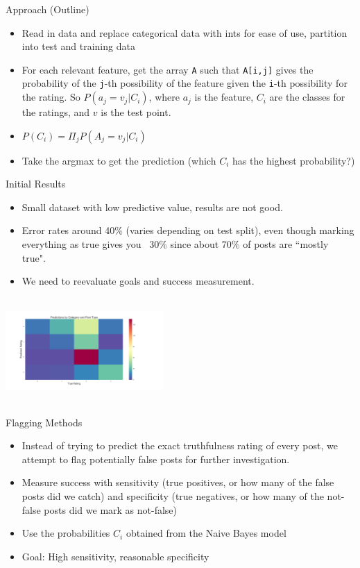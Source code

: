 \documentclass[xcolor=dvipsnames, 14pt]{beamer}
\begin{document}
\begin{frame}{Approach (Outline)}
\small
\begin{itemize}
\item Read in data and replace categorical data with ints for ease of use, partition into test and training data
\item For each relevant feature, get the array \texttt{A} such that \texttt{A[i,j]} gives the probability of the \texttt{j}-th possibility of the feature given the \texttt{i}-th possibility for the rating. So $P(a_j = v_j | C_i)$, where $a_j$ is the feature, $C_i$ are the classes for the ratings, and $v$ is the test point.
\item $P(C_i) = \Pi_j P(A_j = v_j|C_i)$
\item Take the argmax to get the prediction (which $C_i$ has the highest probability?)
\end{itemize}
\end{frame}

\begin{frame}{Initial Results}
\begin{itemize}
\small
\item Small dataset with low predictive value, results are not good.
\item Error rates around 40\% (varies depending on test split), even though marking everything as true gives you ~30\% since about 70\% of posts are ``mostly true".
\item We need to reevaluate goals and success measurement.
\end{itemize}
\centering
\includegraphics[width=6cm,height=4cm]{cat_predicts.png}
\end{frame}

\begin{frame}{Flagging Methods}

\begin{itemize}
\item Instead of trying to predict the exact truthfulness rating of every post, we attempt to flag potentially false posts for further investigation.
\item Measure success with sensitivity (true positives, or how many of the false posts did we catch) and specificity (true negatives, or how many of the not-false posts did we mark as not-false)
\item Use the probabilities $C_i$ obtained from the Naive Bayes model
\item Goal: High sensitivity, reasonable specificity
\end{itemize}

\end{frame}
\end{document}
